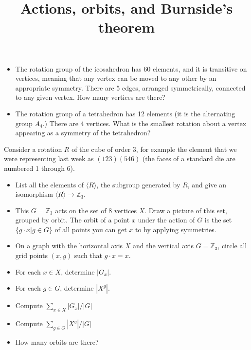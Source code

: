 \documentclass[12pt]{article}
\title{Actions, orbits, and Burnside's theorem}
\date{}
\begin{document}
\maketitle 
\begin{itemize}
\item
The rotation group of the icosahedron has 60 elements, and it is transitive on vertices, meaning that any vertex can be moved to any other by an appropriate symmetry.  There are 5 edges, arranged symmetrically, connected to any given vertex.  How many vertices are there?
\item
The rotation group of a tetrahedron has 12 elements (it is the alternating group $A_4$.)  There are 4 vertices.  What is the smallest rotation about a vertex appearing as a symmetry of the tetrahedron?
\end{itemize}

Consider a rotation $R$ of the cube of order 3, for example the element that we were representing last week as $(123)(546)$ (the faces of a standard die are numbered 1 through 6).
\begin{itemize}
\item
List all the elements of $\langle R\rangle$, the subgroup generated by $R$, and give an isomorphism $\langle R\rangle\rightarrow \mathbb{Z}_3$.
\item
This $G=\mathbb{Z}_3$ acts on the set of 8 vertices $X$.  Draw a picture of this set, grouped by orbit.  The orbit of a point $x$ under the action of $G$ is the set $\{ g\cdot x|g\in G\} $ of all points you can get $x$ to by applying symmetries.
\item
On a graph with the horizontal axis $X$ and the vertical axis $G=\mathbb{Z}_3$, circle all grid points $(x,g)$ such that $g\cdot x=x$.
\item
For each $x\in X$, determine $|G_x|$.
\item
For each $g\in G$, determine $|X^g|$.
\item
Compute $\sum_{x\in X}|G_x|/|G|$
\item
Compute $\sum_{g\in G}|X^g|/|G|$
\item
How many orbits are there?
\end{itemize}
\end{document}
